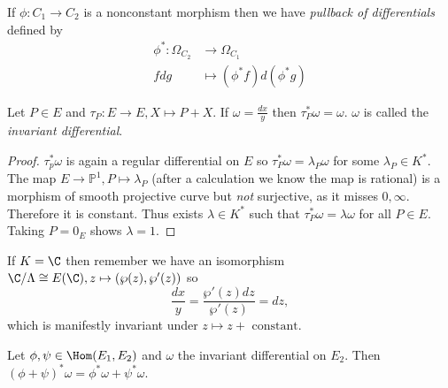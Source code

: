 \documentclass[a4paper]{article}
\theoremstyle{definition}
\theoremstyle{theorem}
\renewcommand*{\P}{\mathbb{P}}
\begin{document}
\begin{definition}
  If \(\phi: C_1 \to C_2\) is a nonconstant morphism then we have \emph{pullback of differentials} defined by
  \begin{align*}
    \phi^*: \Omega_{C_2} &\to \Omega_{C_1} \\
    f dg &\mapsto (\phi^* f) d(\phi^*g)
  \end{align*}
\end{definition}

\begin{lemma}
  Let \(P \in E\) and \(\tau_P: E \to E, X \mapsto P + X\). If \(\omega = \frac{dx}{y}\) then \(\tau_P^* \omega = \omega\). \(\omega\) is called the \emph{invariant differential}.
\end{lemma}

\begin{proof}
  \(\tau_p^*\omega\) is again a regular differential on \(E\) so \(\tau_P^* \omega = \lambda_P \omega\) for some \(\lambda_P \in K^*\). The map \(E \to \P^1, P \mapsto \lambda_P\) (after a calculation we know the map is rational) is a morphism of smooth projective curve but \emph{not} surjective, as it misses \(0, \infty\). Therefore it is constant. Thus exists \(\lambda \in K^*\) such that \(\tau_P^* \omega = \lambda \omega\) for all \(P \in E\). Taking \(P = 0_E\) shows \(\lambda = 1\).
\end{proof}

\begin{remark}
  If \(K = \C\) then remember we have an isomorphism \(\C/\Lambda \cong E(\C), z \mapsto (\wp(z), \wp'(z))\) so
  \[
    \frac{dx}{y} = \frac{\wp'(z) dz}{\wp'(z)} = dz,
  \]
  which is manifestly invariant under \(z \mapsto z + \text{ constant}\).
\end{remark}

\begin{lemma}
  Let \(\phi, \psi \in \Hom(E_1, E_2)\) and \(\omega\) the invariant differential on \(E_2\). Then \((\phi + \psi)^* \omega = \phi^*\omega + \psi^*\omega\).
\end{lemma}
\end{document}
